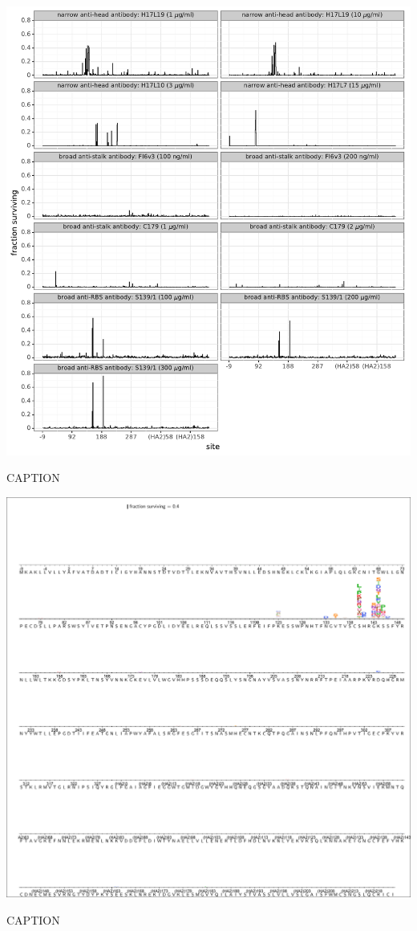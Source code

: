 \documentclass[11pt]{article}
\begin{document}
\begin{suppfigure}
\centerline{\includegraphics[width=\textwidth]{figs/maxfracsurvive.pdf}}
\caption{\label{suppfig:maxfracsurvive}
CAPTION}
\end{suppfigure}

\begin{suppfigure}
\centerline{\includegraphics[trim=0.1cm 0.02cm 0.1cm 0.03cm,clip=true,width=\textwidth]{figs/logoplots/H17L19_fracsurvive.pdf}}
\caption{\label{suppfig:H17L19logo}
CAPTION}
\end{suppfigure}
\end{document}
